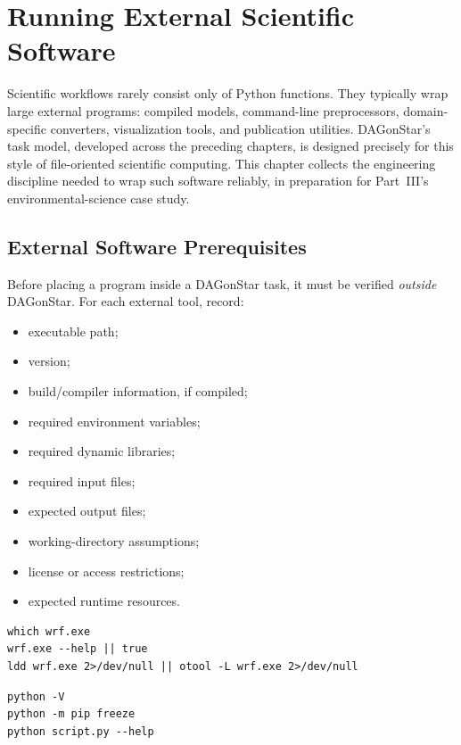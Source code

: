 \chapter{Running External Scientific Software}
\label{ch:external-software}

Scientific workflows rarely consist only of Python functions. They typically
wrap large external programs: compiled models, command-line preprocessors,
domain-specific converters, visualization tools, and publication utilities.
DAGonStar's task model, developed across the preceding chapters, is designed
precisely for this style of file-oriented scientific computing. This chapter
collects the engineering discipline needed to wrap such software reliably,
in preparation for Part~III's environmental-science case study.

\section{External Software Prerequisites}

Before placing a program inside a DAGonStar task, it must be verified
\emph{outside} DAGonStar. For each external tool, record:

\begin{itemize}[leftmargin=1.4em]
  \item executable path;
  \item version;
  \item build/compiler information, if compiled;
  \item required environment variables;
  \item required dynamic libraries;
  \item required input files;
  \item expected output files;
  \item working-directory assumptions;
  \item license or access restrictions;
  \item expected runtime resources.
\end{itemize}

\begin{lstlisting}[style=bash, caption={Verifying a compiled executable before integration.}]
which wrf.exe
wrf.exe --help || true
ldd wrf.exe 2>/dev/null || otool -L wrf.exe 2>/dev/null
\end{lstlisting}

\begin{lstlisting}[style=bash, caption={Verifying a Python tool.}]
python -V
python -m pip freeze
python script.py --help
\end{lstlisting}

